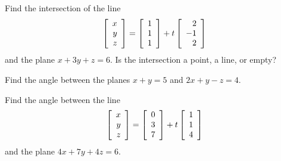 \documentclass{ximera}
\begin{document}
\begin{exercise}
  Find the intersection of the line
  \begin{equation*}
    \startmat{r} x \\ y \\ z \stopmat
    = \startmat{r} 1 \\ 1 \\ 1 \stopmat
    + t \startmat{r} 2 \\ -1 \\ 2 \stopmat
  \end{equation*}
  and the plane $x+3y+z = 6$.
  Is the intersection a point, a line, or empty?
\end{exercise}

\begin{exercise}
  Find the angle between the planes $x+y=5$ and $2x+y-z=4$.
\end{exercise}

\begin{exercise}
  Find the angle between the line
  \begin{equation*}
    \startmat{r} x \\ y \\ z \stopmat
    = \startmat{r} 0 \\ 3 \\ 7 \stopmat
    + t \startmat{r} 1 \\ 1 \\ 4 \stopmat
  \end{equation*}
  and the plane $4x+7y+4z = 6$.
\end{exercise}
\end{document}
